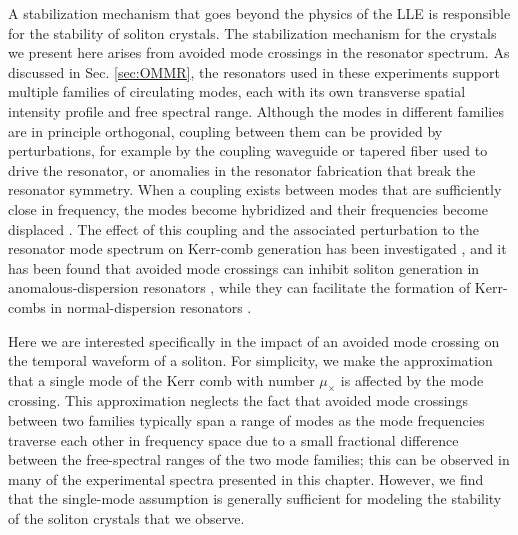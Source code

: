 A stabilization mechanism that goes beyond the physics of the LLE is responsible for the stability of soliton crystals. The stabilization mechanism for the crystals we present here arises from avoided mode crossings in the resonator spectrum. As discussed in Sec. \ref{sec:OMMR}, the resonators used in these experiments support multiple families of circulating modes, each with its own transverse spatial intensity profile and free spectral range. Although the modes in different families are in principle orthogonal, coupling between them can be provided by perturbations, for example by the coupling waveguide or tapered fiber used to drive the resonator, or anomalies in the resonator fabrication that break the resonator symmetry. When a coupling exists between modes that are sufficiently close in frequency, the modes become hybridized and their frequencies become displaced \cite{Haus1991}. The effect of this coupling and the associated perturbation to the resonator mode spectrum on Kerr-comb generation has been investigated \cite{Savchenkov2012}, and it has been found that avoided mode crossings can inhibit soliton generation in anomalous-dispersion resonators \cite{Herr2014a,Yi2015}, while they can facilitate the formation of Kerr-combs in normal-dispersion resonators \cite{Liu2014a,Xue2015,Bao2017}. 



Here we are interested specifically in the impact of an avoided mode crossing on the temporal waveform of a soliton. For simplicity, we make the approximation that a single mode of the Kerr comb with number $\mu_\times$ is affected by the mode crossing. This approximation neglects the fact that avoided mode crossings between two families typically span a range of modes as the mode frequencies traverse each other in frequency space due to a small fractional difference between the free-spectral ranges of the two mode families; this can be observed in many of the experimental spectra presented in this chapter. However, we find that the single-mode assumption is generally sufficient for modeling the stability of the soliton crystals that we observe.

